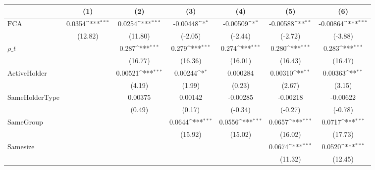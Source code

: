 {
\def\sym#1{\ifmmode^{#1}\else\(^{#1}\)\fi}
\begin{tabular}{l*{6}{c}}
\hline\hline
                    &\multicolumn{1}{c}{(1)}         &\multicolumn{1}{c}{(2)}         &\multicolumn{1}{c}{(3)}         &\multicolumn{1}{c}{(4)}         &\multicolumn{1}{c}{(5)}         &\multicolumn{1}{c}{(6)}         \\
\hline
$ \text{FCA} $      &      0.0354\sym{***}&      0.0254\sym{***}&    -0.00448\sym{*}  &    -0.00509\sym{*}  &    -0.00588\sym{**} &    -0.00864\sym{***}\\
                    &     (12.82)         &     (11.80)         &     (-2.05)         &     (-2.44)         &     (-2.72)         &     (-3.88)         \\
[1em]
$ \rho\_t $          &                     &       0.287\sym{***}&       0.279\sym{***}&       0.274\sym{***}&       0.280\sym{***}&       0.283\sym{***}\\
                    &                     &     (16.77)         &     (16.36)         &     (16.01)         &     (16.43)         &     (16.47)         \\
[1em]
ActiveHolder        &                     &     0.00521\sym{***}&     0.00244\sym{*}  &    0.000284         &     0.00310\sym{**} &     0.00363\sym{**} \\
                    &                     &      (4.19)         &      (1.99)         &      (0.23)         &      (2.67)         &      (3.15)         \\
[1em]
SameHolderType      &                     &     0.00375         &     0.00142         &    -0.00285         &    -0.00218         &    -0.00622         \\
                    &                     &      (0.49)         &      (0.17)         &     (-0.34)         &     (-0.27)         &     (-0.78)         \\
[1em]
SameGroup           &                     &                     &      0.0644\sym{***}&      0.0556\sym{***}&      0.0657\sym{***}&      0.0717\sym{***}\\
                    &                     &                     &     (15.92)         &     (15.02)         &     (16.02)         &     (17.73)         \\
[1em]
Samesize            &                     &                     &                     &                     &      0.0674\sym{***}&      0.0520\sym{***}\\
                    &                     &                     &                     &                     &     (11.32)         &     (12.45)         \\

\end{tabular}}

